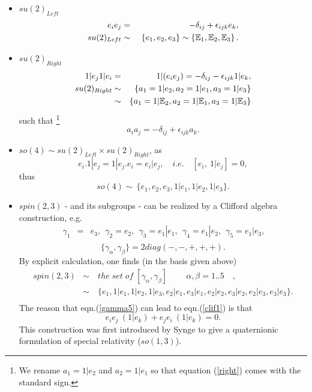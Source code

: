 \documentclass[a4paper,12pt]{book}
\begin{document}
\begin{itemize}
\item  $su(2)_{Left}$ 
\begin{eqnarray}
e_{i}e_{j} &=&-\delta _{ij}+\epsilon _{ijk}e_{k},  \label{p1} \\
su(2)_{Left} &\sim &~\{e_{1},e_{2},e_{3}\}\sim \left\{ \Bbb{E}_{1},\Bbb{E}%
_{2},\Bbb{E}_{3}\right\} .
\end{eqnarray}

\item  $su(2)_{Right}$ 
\begin{eqnarray}
1|e_{j}1|e_{i} &=&1|(e_{i}e_{j})=-\delta _{ij}-\epsilon _{ijk}1|e_{k},
\label{p2} \\
su(2)_{Right} &\sim &~\{a_{1}=1|e_{2},a_{2}=1|e_{1},a_{3}=1|e_{3}\} 
\nonumber \\
&\sim &\left\{ a_{1}=1|\Bbb{E}_{2},a_{2}=1|\Bbb{E}_{1},a_{3}=1|\Bbb{E}%
_{3}\right\}
\end{eqnarray}
such that \footnote{%
We rename $a_{1}=1|e_{2}$ and $a_{2}=1|e_{1}$ so that equation (\ref{right})
comes with the standard sign.} 
\begin{equation}
a_{i}a_{j}=-\delta _{ij}+\epsilon _{ijk}a_{k}.  \label{right}
\end{equation}

\item  $so(4)\sim su(2)_{Left}\times su(2)_{Right}$, as 
\begin{equation}
e_{i}.1|e_{j}=1|e_{j}.e_{i}=e_{i}|e_{j},\quad i.e.\quad [e_{i},~1|e_{j}]=0,
\end{equation}
thus 
\begin{equation}
so(4)\sim ~\{e_{1},e_{2},e_{3},1|e_{1},1|e_{2},1|e_{3}\}.
\end{equation}

\item  $spin(2,3)$ - and its subgroups - can be realized by a Clifford
algebra construction, e.g. 
\begin{eqnarray}
~\gamma _{1} &=&e_{3},~~\gamma _{2}=e_{2},~~\gamma _{3}=e_{1}|e_{1},~~\gamma
_{4}=e_{1}|e_{2},~~\gamma _{5}=e_{1}|e_{3},  \nonumber \\
&&  \label{gamma5}
\end{eqnarray}
\begin{equation}
\{\gamma _{\alpha },\gamma _{\beta }\}=2diag(-,-,+,+,+).  \label{clif1}
\end{equation}
By explicit calculation, one finds (in the basis given above) 
\begin{eqnarray}
spin(2,3) &\sim &~the\;set\;of\;[\gamma _{\alpha },\gamma _{\beta }]\quad
\quad {\ \alpha ,\beta =1..5}\quad ,  \nonumber \\
&\sim
&~%
\{e_{1},1|e_{1},1|e_{2},1|e_{3},e_{2}|e_{1},e_{3}|e_{1},e_{2}|e_{2},e_{3}|e_{2},e_{2}|e_{3},e_{3}|e_{3}\}.
\nonumber \\
&&
\end{eqnarray}
The reason that eqn.(\ref{gamma5}) can lead to eqn.(\ref{clif1}) is that 
\[
e_{i}e_{j}~\left( 1|e_{k}\right) +e_{j}e_{i}~\left( 1|e_{k}\right) =0. 
\]
This construction was first introduced by Synge \cite{synge} to give a
quaternionic formulation of special relativity ($so(1,3)$).


\end{itemize}
\end{document}
